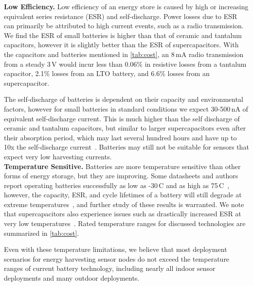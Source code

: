 \vspace{-6pt}
\noindent
\textbf{Low Efficiency.}
Low efficiency of an energy store is
caused by high or increasing equivalent series resistance (ESR) and
self-discharge.  Power losses due to ESR can primarily be attributed to high
current events, such as a radio transmission. We find the ESR of small
batteries is higher than that of ceramic and tantalum capacitors, however it is
slightly better than the ESR of supercapacitors.
With the
capacitors and batteries mentioned in \cref{tab:cost}, an 8\,mA radio
transmission from a steady 3\,V would incur less
than 0.06\% in resistive losses from a tantalum capacitor, 2.1\% losses from an
LTO battery, and 6.6\% losses from an supercapacitor.

The self-discharge of batteries is dependent on their capacity and environmental
factors, however for small batteries in standard conditions we expect 30-500\,nA
of equivalent self-discharge current. This is much higher than the self discharge
of ceramic and tantalum capacitors, but similar to larger supercapacitors
even after their absorption period, which may last several hundred hours and
have up to 10x the self-discharge current~\cite{murataTech}. Batteries may
still not be suitable for sensors that expect very low harvesting currents.\\

\vspace{-6pt}
\noindent
\textbf{Temperature Sensitive.}
Batteries are
more temperature sensitive
than other forms of energy storage, but they are improving.
Some
datasheets and authors report operating batteries successfully as low as -30\,\textdegree C
and as high as 75\,\textdegree C~\cite{LTODatasheet2, lifepo4Datasheet, chenEvaluation15}, however, the capacity, ESR, and cycle lifetimes of a battery will still
degrade at extreme temperatures~\cite{wangCycle11, swierczynskiInvestigation14},
and further study of these results is warranted. We note that
supercapacitors also experience issues such as drastically increased ESR at very
low temperatures~\cite{murataTech}. Rated temperature ranges for discussed technologies are summarized in \cref{tab:cost}.

Even with these temperature limitations,
we believe that most deployment scenarios for energy harvesting sensor
nodes do not exceed the temperature ranges of current battery technology, including
nearly all indoor sensor deployments and many outdoor deployments.
\\

